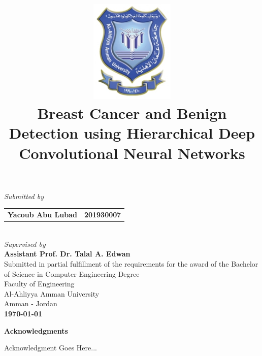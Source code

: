 \documentclass[12pt]{extarticle}
\title{\includegraphics[width=4cm]{pics/AAU_Logo.jpg}\\\Large{\textbf{Breast Cancer and Benign Detection using Hierarchical Deep Convolutional Neural Networks}}
\date{}}
\begin{document}
	\clearpage\maketitle
	\begin{center}
		\vspace{-1.5cm}
		\large{\emph{Submitted by}}\\\vspace{0.5cm}
		\begin{tabular}{l l}
			
			\multicolumn{1}{p{6cm}}{ \large{\textbf{Yacoub Abu Lubad}}} &  \multicolumn{1}{p{6cm}}{\centering \large{\textbf{201930007}}} 
		\end{tabular}\\\vspace{1cm}
		\large{\emph{Supervised by}}\\\vspace{0.5cm}
		\large{\textbf{Assistant Prof. Dr. Talal A. Edwan}}\\\vspace{1cm}
		{Submitted in partial fulfillment of the requirements for the award of the Bachelor of Science in Computer Engineering Degree\\\vspace{1cm}
		Faculty of Engineering\\Al-Ahliyya Amman University\\Amman - Jordan}\\ \vspace{0.5cm}
		\Large{\textbf{\monthyeardate\today}}
		
		\thispagestyle{empty}
	\end{center}
	\newpage
	\setcounter{page}{1}
	\begin{center}
	\Large{\textbf{Acknowledgments}}\\ \vspace{1cm}
	\end{center}
	Acknowledgment Goes Here...
	\newpage
	
\end{document}
